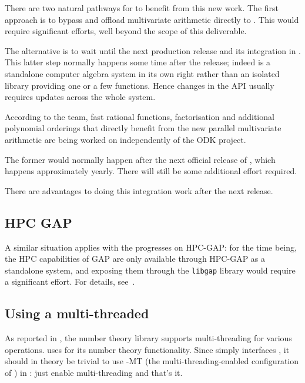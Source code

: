 \documentclass{deliverablereport}
\begin{document}
There are two natural pathways for \Sage to benefit from this new
work. The first approach is to bypass \Singular and offload
multivariate arithmetic directly to \FLINT. This would require
significant efforts, well beyond the scope of this deliverable.

The alternative is to wait until the next \Singular production release
and its integration in \Sage. This latter step normally happens some
time after the \Singular release; indeed \Singular is a standalone
computer algebra system in its own right rather than an isolated
library providing one or a few functions. Hence changes in the
\Singular API usually requires updates across the whole \Sage system.



According to the \Singular team, fast rational functions,
factorisation and additional polynomial orderings that directly
benefit from the new parallel multivariate arithmetic are being worked
on independently of the ODK project.

The former would normally happen after the next official release of
\Singular, which happens approximately yearly. There will still be
some additional effort required.

There are advantages to doing this integration work after the next release. 


\subsection{HPC GAP}

A similar situation applies with the progresses on HPC-GAP: for the
time being, the HPC capabilities of GAP are only available through
HPC-GAP as a standalone system, and exposing them through the
\texttt{libgap} library would require a significant effort. For
details, see~.

\subsection{Using a multi-threaded \Pari}

As reported in , the number theory library \Pari supports
multi-threading for various operations.
\Sage uses \Pari for its number theory functionality.
Since \Sage simply interfaces \Pari, it should in theory
be trivial to use \Pari-MT (the multi-threading-enabled configuration of \Pari) in \Sage:
just enable multi-threading and that's it.
\end{document}
